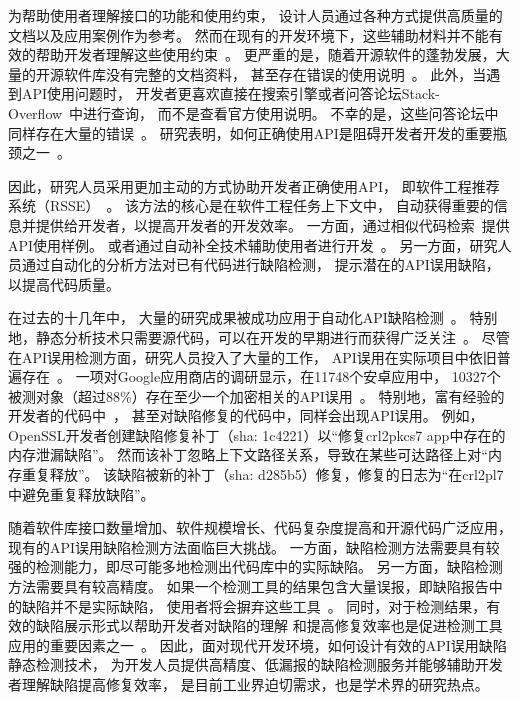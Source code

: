 



为帮助使用者理解接口的功能和使用约束，
设计人员通过各种方式提供高质量的文档以及应用案例作为参考。
然而在现有的开发环境下，这些辅助材料并不能有效的帮助开发者理解这些使用约束~\cite{09-icse-doc}。
更严重的是，随着开源软件的蓬勃发展，大量的开源软件库没有完整的文档资料，
甚至存在错误的使用说明~\cite{15-ieee-doc-fail, 17-icse-api-doc}。
此外，当遇到API使用问题时，
开发者更喜欢直接在搜索引擎或者问答论坛Stack-Overflow~\cite{stackoverflow}中进行查询，
而不是查看官方使用说明。
不幸的是，这些问答论坛中同样存在大量的错误~\cite{16-sp-stack}。
研究表明，如何正确使用API是阻碍开发者开发的重要瓶颈之一~\cite{16-icse-cry}。


因此，研究人员采用更加主动的方式协助开发者正确使用API，
即软件工程推荐系统（RSSE）~\cite{10-ieee-rsse}。
该方法的核心是在软件工程任务上下文中，
自动获得重要的信息并提供给开发者，以提高开发者的开发效率。
一方面，通过相似代码检索~\cite{05-icse-rec,16-icse-doc-stack,14-msr-stack}提供API使用样例。
或者通过自动补全技术辅助使用者进行开发~\cite{15-tosem-code-cplt}。
另一方面，研究人员通过自动化的分析方法对已有代码进行缺陷检测，
提示潜在的API误用缺陷，以提高代码质量。


在过去的十几年中，
大量的研究成果被成功应用于自动化API缺陷检测~\cite{15-coufless-static-survey,18-icse-saful,survey18}。
特别地，静态分析技术只需要源代码，可以在开发的早期进行而获得广泛关注~\cite{05-icse-static}。
尽管在API误用检测方面，研究人员投入了大量的工作，
API误用在实际项目中依旧普遍存在~\cite{16-ase-spec, 18-icse-stack}。
一项对Google应用商店的调研显示，在11748个安卓应用中，
10327个被测对象（超过88\%）存在至少一个加密相关的API误用~\cite{13-ccs-misuse}。
特别地，富有经验的开发者的代码中~\cite{18-soups-api-blind}，
甚至对缺陷修复的代码中，同样会出现API误用。
例如，OpenSSL开发者创建缺陷修复补丁（sha: 1c4221）以``修复crl2pkcs7 app中存在的内存泄漏缺陷''。
然而该补丁忽略上下文路径关系，导致在某些可达路径上对``内存重复释放''。
该缺陷被新的补丁（sha: d285b5）修复，修复的日志为``在crl2pl7中避免重复释放缺陷''。


随着软件库接口数量增加、软件规模增长、代码复杂度提高和开源代码广泛应用，
现有的API误用缺陷检测方法面临巨大挑战。
一方面，缺陷检测方法需要具有较强的检测能力，即尽可能多地检测出代码库中的实际缺陷。
另一方面，缺陷检测方法需要具有较高精度。
如果一个检测工具的结果包含大量误报，即缺陷报告中的缺陷并不是实际缺陷，
使用者将会摒弃这些工具~\cite{10-acm-precision}。
同时，对于检测结果，有效的缺陷展示形式以帮助开发者对缺陷的理解
和提高修复效率也是促进检测工具应用的重要因素之一~\cite{13-icse-donotuse}。
因此，面对现代开发环境，如何设计有效的API误用缺陷静态检测技术，
为开发人员提供高精度、低漏报的缺陷检测服务并能够辅助开发者理解缺陷提高修复效率，
是目前工业界迫切需求，也是学术界的研究热点。


